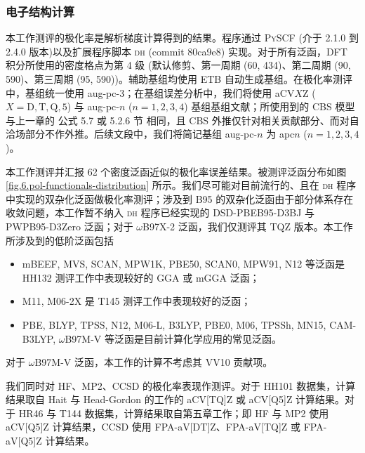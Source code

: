 \subsubsection{电子结构计算}

本工作测评的极化率是解析梯度计算得到的结果。程序通过 \textsc{PySCF} (介于 2.1.0 到 2.4.0 版本)\cite{Sun-Chan.WCMS.2018, Sun-Chan.JCP.2020}以及扩展程序脚本 \textsc{dh} (commit 80ca9e8)\cite{dh.ajz34} 实现。对于所有泛函，DFT 积分所使用的密度格点为第 4 级 (默认修剪、第一周期 (60, 434)、第二周期 (90, 590)、第三周期 (95, 590))。辅助基组均使用 ETB 自动生成基组\cite{Stoychev-Neese.JCTC.2017}。在极化率测评中，基组统一使用 aug-pc-3\cite{Jensen-Jensen.JCP.2001, Jensen-Jensen.JCP.2002, Jensen-Jensen.JCP.2002a, Jensen-Helgaker.JCP.2004, Jensen-Jensen.JPCA.2007, Jensen-Jensen.JCP.2012}；在基组误差分析中，我们将使用 aCV$X$Z ($X = \mathrm{D, T, Q, 5}$) 与 aug-pc-$n$ ($n = 1, 2, 3, 4$) 基组\alert{基组文献}；所使用到的 CBS 模型与上一章的 \alert{公式 5.7 或 5.2.6 节} 相同，且 CBS 外推仅针对相关贡献部分、而对自洽场部分不作外推。后续文段中，我们将简记基组 aug-pc-$n$ 为 apc$n$ ($n = 1, 2, 3, 4$)。

本工作测评并汇报 62 个密度泛函近似的极化率误差结果。被测评泛函分布如图 \ref{fig.6.pol-functionals-distribution} 所示。我们尽可能对目前流行的、且在 \textsc{dh} 程序中实现的双杂化泛函做极化率测评；涉及到 B95 的双杂化泛函由于部分体系存在收敛问题，本工作暂不纳入 \textsc{dh} 程序已经实现的 DSD-PBEB95-D3BJ 与 PWPB95-D3Zero 泛函；对于 $\omega$B97X-2 泛函，我们仅测评其 TQZ 版本。本工作所涉及到的低阶泛函包括
\begin{itemize}[nosep]
    \item mBEEF, MVS, SCAN, MPW1K, PBE50, SCAN0, MPW91, N12 等泛函是 HH132 测评工作\cite{Hait-Head-Gordon.PCCP.2018}中表现较好的 GGA 或 mGGA 泛函；
    \item M11, M06-2X 是 T145 测评工作\cite{Wu-Thakkar.CPL.2015}中表现较好的泛函；
    \item PBE, BLYP, TPSS, N12, M06-L, B3LYP, PBE0, M06, TPSSh, MN15, CAM-B3LYP, $\omega$B97M-V 等泛函是目前计算化学应用的常见泛函。
\end{itemize}
对于 $\omega$B97M-V 泛函，本工作的计算不考虑其 VV10 贡献项。

我们同时对 HF、MP2、CCSD 的极化率表现作测评。对于 HH101 数据集，计算结果取自 Hait 与 Head-Gordon 的工作的 aCV[TQ]Z 或 aCV[Q5]Z 计算结果。对于 HR46 与 T144 数据集，计算结果取自第五章工作；即 HF 与 MP2 使用 aCV[Q5]Z 计算结果，CCSD 使用 FPA-aV[DT]Z、FPA-aV[TQ]Z 或 FPA-aV[Q5]Z 计算结果。

